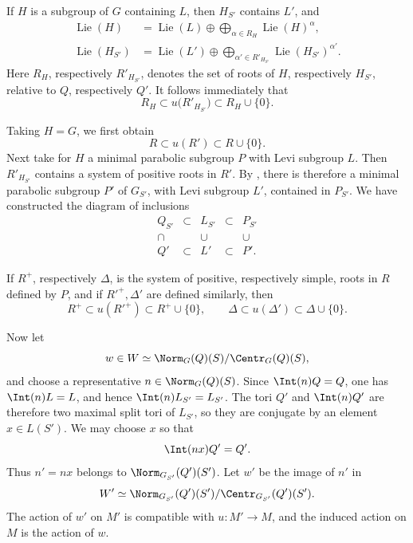 If \(H\) is a subgroup of \(G\) containing \(L\), then \(H_{S'}\)
contains \(L'\), and
\[
\begin{aligned}
 \operatorname{Lie}(H)
  &=\operatorname{Lie}(L)
    \oplus\bigoplus_{\alpha\in R_H}
       \operatorname{Lie}(H)^\alpha,\\
 \operatorname{Lie}(H_{S'})
  &=\operatorname{Lie}(L')
    \oplus\bigoplus_{\alpha'\in R'_{H_{S'}}}
       \operatorname{Lie}(H_{S'})^{\alpha'}.
\end{aligned}
\]
Here \(R_H\), respectively \(R'_{H_{S'}}\), denotes the set of
roots of \(H\), respectively \(H_{S'}\), relative to \(Q\),
respectively \(Q'\).  It follows immediately that
\[
 R_H\subset u\bigl(R'_{H_{S'}}\bigr)
       \subset R_H\cup\{0\}.
\]

Taking \(H=G\), we first obtain
\[
 R\subset u(R')\subset R\cup\{0\}.
\]
Next take for \(H\) a minimal parabolic subgroup \(P\) with Levi
subgroup \(L\).  Then \(R'_{H_{S'}}\) contains a system of positive
roots in \(R'\).  By , there is therefore a minimal parabolic
subgroup \(P'\) of \(G_{S'}\), with Levi subgroup \(L'\), contained
in \(P_{S'}\).  We have constructed the diagram of inclusions
\[
\begin{array}{ccccc}
 Q_{S'} & \subset & L_{S'} & \subset & P_{S'}\\[1.2ex]
 \cap   &         & \cup   &         & \cup\\[1.2ex]
 Q'     & \subset & L'     & \subset & P'.
\end{array}
\]

If \(R^+\), respectively \(\Delta\), is the system of positive,
respectively simple, roots in \(R\) defined by \(P\), and if
\(R'^+,\Delta'\) are defined similarly, then
\[
 R^+\subset u(R'^+)\subset R^+\cup\{0\},
 \qquad
 \Delta\subset u(\Delta')\subset\Delta\cup\{0\}.
\]

Now let
\[
 w\in W\simeq\Norm_G(Q)(S)/\Centr_G(Q)(S),
\]
and choose a representative \(n\in\Norm_G(Q)(S)\).  Since
\(\Int(n)Q=Q\), one has \(\Int(n)L=L\), and hence
\(\Int(n)L_{S'}=L_{S'}\).  The tori \(Q'\) and \(\Int(n)Q'\) are
therefore two maximal split tori of \(L_{S'}\), so they are
conjugate by an element \(x\in L(S')\).  We may choose \(x\) so that
\[
 \Int(nx)Q'=Q'.
\]
Thus \(n'=nx\) belongs to \(\Norm_{G_{S'}}(Q')(S')\).  Let \(w'\)
be the image of \(n'\) in
\[
 W'\simeq
 \Norm_{G_{S'}}(Q')(S')/\Centr_{G_{S'}}(Q')(S').
\]
The action of \(w'\) on \(M'\) is compatible with
\(u:M'\to M\), and the induced action on \(M\) is the action of
\(w\).


